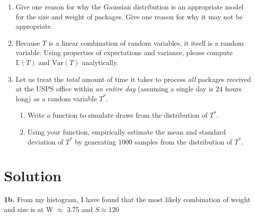 \documentclass{harvardml}
\theoremstyle{definition}
\theoremstyle{plain}
\newenvironment{solution}
  {\color{blue}\section*{Solution}}
{}
\begin{document}
\begin{problem}
\begin{enumerate}
    \item Give one reason for why the Gaussian distribution is an appropriate model for the size and weight of packages. Give one reason for why it may not be appropriate.
    \item Because $T$ is a linear combination of random variables, it itself is a random variable. Using properties of expectations and variance, please compute $\mathbb{E}(T)$ and $\mathrm{Var}(T)$ analytically.
    \item Let us treat the \textit{total} amount of time it takes to process \textit{all} packages received at the USPS office within \textit{an entire day} (assuming a single day is $24$ hours long) as a random variable $T^{*}$. 
    \begin{enumerate}
        \item Write a function to simulate draws from the distribution of $T^{*}$. 
        \item Using your function, empirically estimate the mean and standard deviation of $T^{*}$ by generating $1000$ samples from the distribution of $T^{*}$.
    \end{enumerate}
\end{enumerate}
\end{problem}

\newpage

\begin{solution}
	\textbf{1b.} From my histogram, I have found that the most likely combination of weight and size is 
    at W $\approx$ 3.75 and $S \approx 120$ 
\end{solution} 
\end{document}
